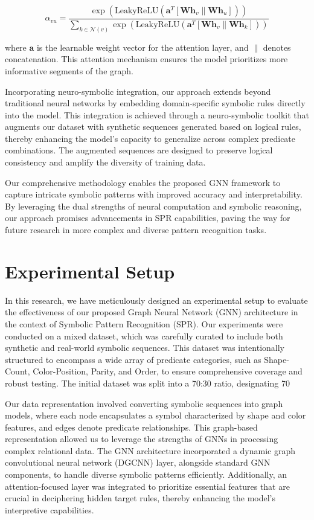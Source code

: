 \documentclass{article}
\begin{document}
\[
\alpha_{vu} = \frac{\exp \left( \text{LeakyReLU} \left( \mathbf{a}^T [\mathbf{W}\mathbf{h}_v \parallel \mathbf{W}\mathbf{h}_u] \right) \right)}{\sum_{k \in \mathcal{N}(v)} \exp \left( \text{LeakyReLU} \left( \mathbf{a}^T [\mathbf{W}\mathbf{h}_v \parallel \mathbf{W}\mathbf{h}_k] \right) \right)}
\]

where \( \mathbf{a} \) is the learnable weight vector for the attention layer, and \( \parallel \) denotes concatenation. This attention mechanism ensures the model prioritizes more informative segments of the graph.

Incorporating neuro-symbolic integration, our approach extends beyond traditional neural networks by embedding domain-specific symbolic rules directly into the model. This integration is achieved through a neuro-symbolic toolkit that augments our dataset with synthetic sequences generated based on logical rules, thereby enhancing the model's capacity to generalize across complex predicate combinations. The augmented sequences are designed to preserve logical consistency and amplify the diversity of training data.

Our comprehensive methodology enables the proposed GNN framework to capture intricate symbolic patterns with improved accuracy and interpretability. By leveraging the dual strengths of neural computation and symbolic reasoning, our approach promises advancements in SPR capabilities, paving the way for future research in more complex and diverse pattern recognition tasks.

\section{Experimental Setup}
In this research, we have meticulously designed an experimental setup to evaluate the effectiveness of our proposed Graph Neural Network (GNN) architecture in the context of Symbolic Pattern Recognition (SPR). Our experiments were conducted on a mixed dataset, which was carefully curated to include both synthetic and real-world symbolic sequences. This dataset was intentionally structured to encompass a wide array of predicate categories, such as Shape-Count, Color-Position, Parity, and Order, to ensure comprehensive coverage and robust testing. The initial dataset was split into a 70:30 ratio, designating 70%

Our data representation involved converting symbolic sequences into graph models, where each node encapsulates a symbol characterized by shape and color features, and edges denote predicate relationships. This graph-based representation allowed us to leverage the strengths of GNNs in processing complex relational data. The GNN architecture incorporated a dynamic graph convolutional neural network (DGCNN) layer, alongside standard GNN components, to handle diverse symbolic patterns efficiently. Additionally, an attention-focused layer was integrated to prioritize essential features that are crucial in deciphering hidden target rules, thereby enhancing the model's interpretive capabilities.
\end{document}
